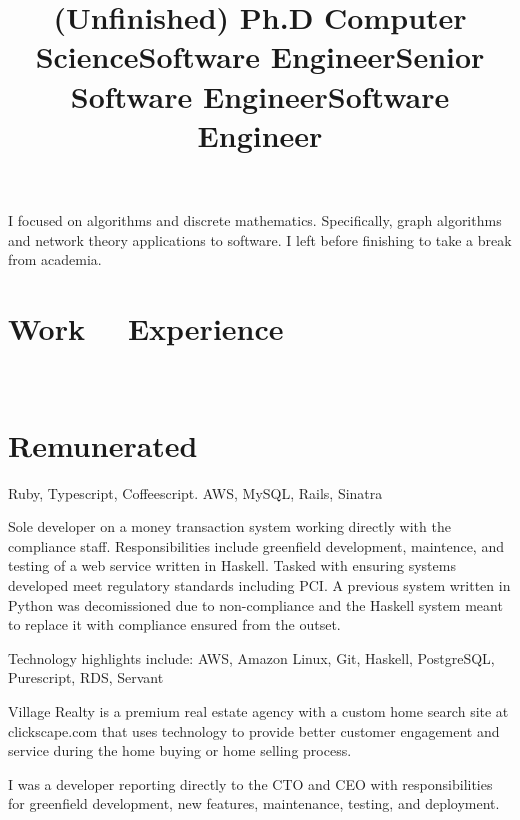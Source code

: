 \documentclass[margintitle,line]{res}
\renewcommand{\subsection}[1]{\section{\normalfont #1}}
\begin{document}
\begin{resume}
\title{(Unfinished) Ph.D Computer Science}
\begin{position}
I focused on algorithms and discrete mathematics. Specifically, graph
algorithms and network theory applications to software. I left before
finishing to take a break from academia.
\end{position}

\section{Work \ \ Experience}
\ \\
\subsection{Remunerated}

\title{Software Engineer}
\begin{position}
Ruby, Typescript, Coffeescript.
AWS, MySQL, Rails, Sinatra
\end{position}

\title{Senior Software Engineer}
\begin{position}
  Sole developer on a money transaction system working directly with the
  compliance staff. Responsibilities include greenfield
  development, maintence, and testing of a web service written in Haskell. Tasked
  with ensuring systems developed meet regulatory standards including PCI. A
  previous system written in Python was decomissioned due to non-compliance and
  the Haskell system meant to replace it with compliance ensured from the outset.

  Technology highlights include: AWS, Amazon Linux, Git, Haskell, PostgreSQL,
  Purescript, RDS, Servant
\end{position}

\title{Software Engineer}
\begin{position}
  Village Realty is a premium real estate agency with a custom home search site
  at clickscape.com that uses technology to provide better customer engagement
  and service during the home buying or home selling process.

  I was a developer reporting directly to the CTO and CEO with responsibilities
  for greenfield development, new features, maintenance, testing, and deployment.


\end{position}
\end{resume}
\end{document}
